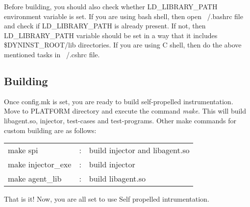 Before building, you should also check whether LD\_LIBRARY\_PATH environment
variable is set. If you are using bash shell, then open ~/.bashrc file and check
if LD\_LIBRARY\_PATH is already present. If not, then LD\_LIBRARY\_PATH variable
should be set in a way that it includes {\$DYNINST\_ROOT}/lib directories.  If
you are using C shell, then do the above mentioned tasks in ~/.cshrc file.
 
\subsection{Building}
Once config.mk is set, you are ready to build self-propelled
instrumentation. Move to PLATFORM directory and execute the command
\textit{make}. This will build libagent.so, injector, test-cases and
test-programs. Other make commands for custom building are as follows:

\begin{table}[h]
\begin{tabular}{l c l}
make spi&:& build injector and libagent.so \\
make injector\_exe&:& build injector \\
make agent\_lib&: &build libagent.so  \\
\end{tabular}
\end{table}

That is it! Now, you are all set to use Self propelled intrumentation.
